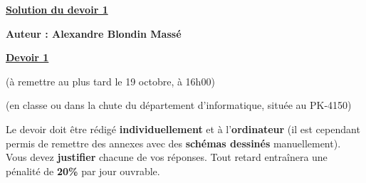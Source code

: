 \documentclass[12pt,addpoints]{exam}
\begin{document}
	
\ifprintanswers
  \vskip 1.2cm
  \centerline{\large\underline{\textbf{Solution du devoir 1}}}
  \vskip 0.5cm
  \begin{mdframed} \begin{center}
  \textbf{Auteur : Alexandre Blondin Massé} \\
  \end{center} \end{mdframed}
  \vskip 0.5cm
\else
  \vskip 1.2cm
  \centerline{\large\underline{\textbf{Devoir 1}}}
  \centerline{\small (à remettre au plus tard le 19 octobre, à 16h00)}
  \centerline{\small (en classe ou dans la chute du département d'informatique, située au PK-4150)}
  \vskip 1.2cm
Le devoir doit être rédigé \textbf{individuellement} et à l'\textbf{ordinateur} (il est cependant permis de remettre des annexes avec des \textbf{schémas dessinés} manuellement). Vous devez \textbf{justifier} chacune de vos réponses. Tout retard entraînera une pénalité de \textbf{20\%} par jour ouvrable.
\fi

\ifprintanswers
\else
\begin{center} \gradetable[h] \end{center}
\fi
\end{document}

